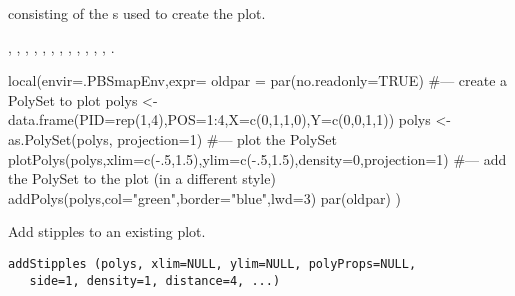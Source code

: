 \documentclass[letterpaper]{book}
\begin{document}
%
\begin{Value}
 consisting of the s used to create the plot.
\end{Value}
%
\begin{SeeAlso}\relax
{},
,
,
,
,
,
,
,
,
,
,
,
.
\end{SeeAlso}
%
\begin{Examples}
\begin{ExampleCode}
local(envir=.PBSmapEnv,expr={
  oldpar = par(no.readonly=TRUE)
  #--- create a PolySet to plot
  polys <- data.frame(PID=rep(1,4),POS=1:4,X=c(0,1,1,0),Y=c(0,0,1,1))
  polys <- as.PolySet(polys, projection=1)
  #--- plot the PolySet
  plotPolys(polys,xlim=c(-.5,1.5),ylim=c(-.5,1.5),density=0,projection=1)
  #--- add the PolySet to the plot (in a different style)
  addPolys(polys,col="green",border="blue",lwd=3)
  par(oldpar)
})
\end{ExampleCode}
\end{Examples}
%
\begin{Description}\relax
Add stipples to an existing plot.
\end{Description}
%
\begin{Usage}
\begin{verbatim}
addStipples (polys, xlim=NULL, ylim=NULL, polyProps=NULL,
   side=1, density=1, distance=4, ...)
\end{verbatim}
\end{Usage}
%
\end{document}
